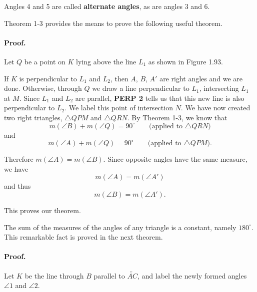 \documentclass[12pt]{book} %
\begin{document}
Angles 4 and 5 are called \textbf{alternate angles}, as are angles 3 and 6.

Theorem 1-3 provides the means to prove the following useful theorem.



\paragraph{Proof.}
Let $Q$ be a point on $K$ lying above the line $L_1$ as shown in Figure 1.93.


If $K$ is perpendicular to $L_1$ and $L_2$, then $A$, $B$, $A'$ are right angles and we are done. Otherwise, through $Q$ we draw a line perpendicular to $L_1$, intersecting $L_1$ at $M$. Since $L_1$ and $L_2$ are parallel, \textbf{PERP 2} tells us that this new line is also perpendicular to $L_2$. We label this point of intersection $N$. We have now created two right triangles, $\triangle QPM$ and $\triangle QRN$. By Theorem 1-3, we know that
\[
m(\angle B)+m(\angle Q)=90^\circ \qquad \text{(applied to } \triangle QRN\text{)}
\]
and
\[
m(\angle A)+m(\angle Q)=90^\circ \qquad \text{(applied to } \triangle QPM\text{)}.
\]

Therefore $m(\angle A)=m(\angle B)$. Since opposite angles have the same measure, we have
\[
m(\angle A)=m(\angle A')
\]
and thus
\[
m(\angle B)=m(\angle A').
\]

This proves our theorem.

The sum of the measures of the angles of any triangle is a constant, namely $180^\circ$. This remarkable fact is proved in the next theorem.


\paragraph{Proof.}
Let $K$ be the line through $B$ parallel to $\overleftrightarrow{AC}$, and label the newly formed angles $\angle 1$ and $\angle 2$.

\end{document}
